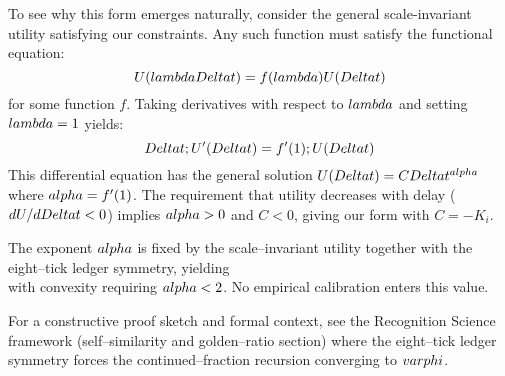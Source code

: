 \documentclass[twocolumn,prd,amsmath,amssymb,aps,superscriptaddress,nofootinbib]{revtex4-2}
\begin{document}
To see why this form emerges naturally, consider the general scale-invariant utility satisfying our constraints. Any such function must satisfy the functional equation:
\begin{equation}
U(\\lambda \\Delta t) = f(\\lambda) U(\\Delta t)
\end{equation}
for some function $f$. Taking derivatives with respect to $\\lambda$ and setting $\\lambda = 1$ yields:
\begin{equation}
\\Delta t \\; U'(\\Delta t) = f'(1) \\; U(\\Delta t)
\end{equation}
This differential equation has the general solution $U(\\Delta t) = C \\Delta t^{\\alpha}$ where $\\alpha = f'(1)$. The requirement that utility decreases with delay ($dU/d\\Delta t < 0$) implies $\\alpha > 0$ and $C < 0$, giving our form with $C = -K_i$.

The exponent $\\alpha$ is fixed by the scale--invariant utility together with the eight--tick ledger symmetry, yielding
\\[
  \\alpha \\,=\\, \\tfrac12\\Bigl(1 - \\tfrac{1}{\\varphi}\\Bigr)\\;\\approx\\;0.191\\;,
\\]
with convexity requiring $\\alpha<2$. No empirical calibration enters this value.

For a constructive proof sketch and formal context, see the Recognition Science framework (self--similarity and golden--ratio section) where the eight--tick ledger symmetry forces the continued--fraction recursion converging to $\\varphi$.
\end{document}
